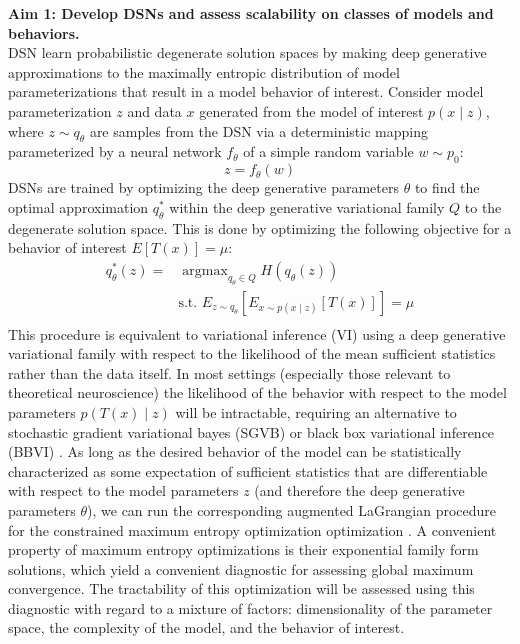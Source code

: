 \documentclass[11pt]{article}
\DeclareMathOperator*{\argmax}{argmax}
\begin{document}
\textbf{Aim 1: Develop DSNs and assess scalability on classes of models and behaviors.} \\
DSN learn probabilistic degenerate solution spaces by making deep generative approximations to the maximally entropic distribution of model parameterizations that result in a model behavior of interest.  Consider model parameterization $z$ and data $x$ generated from the model of interest $p(x \mid z)$, where $z \sim q_{\theta}$ are samples from the DSN via a deterministic mapping parameterized by a neural network $f_\theta$ of a simple random variable $w \sim p_0$: \\
\begin{equation} z = f_{\theta}(w) \end{equation} 
 DSNs are trained by optimizing the deep generative parameters $\theta$ to find the optimal approximation $q_{\theta}^*$ within the deep generative variational family $Q$ to the degenerate solution space.  This is done by optimizing the following objective for a behavior of interest $ E\left[ T(x)\right] = \mu$:
\begin{equation}
\begin{split}
q_\theta^*(z) = & \argmax_{q_\theta \in Q} H(q_\theta(z)) \\
& \text{s.t.  } E_{z \sim q_\theta}\left[ E_{x\sim p(x \mid z)}\left[T(x)\right] \right] = \mu \\
\end{split}
\end{equation}
This procedure is equivalent to variational inference (VI) using a deep generative variational family with respect to the likelihood of the mean sufficient statistics rather than the data itself.  In most settings (especially those relevant to theoretical neuroscience) the likelihood of the behavior with respect to the model parameters $p(T(x) \mid z)$ will be intractable, requiring an alternative to stochastic gradient variational bayes (SGVB) \cite{kingma2013auto} or black box variational inference (BBVI) \cite{ranganath2014black}. As long as the desired behavior of the model can be statistically characterized as some expectation of sufficient statistics that are differentiable with respect to the model parameters $z$ (and therefore the deep generative parameters $\theta$), we can run the corresponding augmented LaGrangian procedure for the constrained maximum entropy optimization optimization \cite{loaiza2017maximum}.  A convenient property of maximum entropy optimizations is their exponential family form solutions, which yield a convenient diagnostic for assessing global maximum convergence. The tractability of this optimization will be assessed using this diagnostic with regard to a mixture of factors: dimensionality of the parameter space, the complexity of the model, and the behavior of interest.
\end{document}
